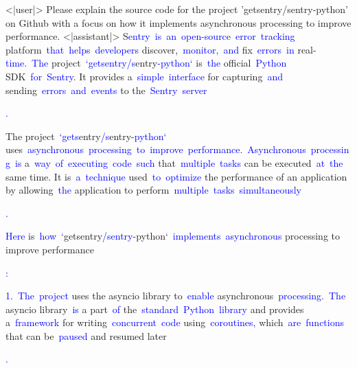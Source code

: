 \documentclass{article}
\begin{document}
\begin{tcolorbox}[colframe=black,colback=white]
<|user|>
Please explain the source code for the project 'getsentry/sentry-python' on Github with a focus on how it implements asynchronous processing to improve performance.
<|assistant|>
S\textcolor{blue}{entry}\textcolor{blue}{~is}\textcolor{blue}{~an}\textcolor{blue}{~open}\textcolor{blue}{-source}\textcolor{blue}{~error}\textcolor{blue}{~tracking} platform\textcolor{blue}{~that}\textcolor{blue}{~helps}\textcolor{blue}{~developers} discover,\textcolor{blue}{~monitor}\textcolor{blue}{,}\textcolor{blue}{~and} fix\textcolor{blue}{~errors}\textcolor{blue}{~in} real\textcolor{blue}{-time}\textcolor{blue}{.}\textcolor{blue}{~The} project\textcolor{blue}{~`}\textcolor{blue}{gets}\textcolor{blue}{entry}\textcolor{blue}{/s}entry\textcolor{blue}{-python}\textcolor{blue}{`} is\textcolor{blue}{~the} official\textcolor{blue}{~Python} SDK\textcolor{blue}{~for}\textcolor{blue}{~Sentry}. It provides a\textcolor{blue}{~simple}\textcolor{blue}{~interface} for capturing\textcolor{blue}{~and} sending\textcolor{blue}{~errors}\textcolor{blue}{~and}\textcolor{blue}{~events} to the\textcolor{blue}{~Sentry}\textcolor{blue}{~server}\textcolor{blue}{.

}The project\textcolor{blue}{~`}\textcolor{blue}{gets}entry\textcolor{blue}{/s}entry\textcolor{blue}{-python}\textcolor{blue}{`} uses\textcolor{blue}{~asynchronous}\textcolor{blue}{~processing}\textcolor{blue}{~to}\textcolor{blue}{~improve}\textcolor{blue}{~performance}\textcolor{blue}{.}\textcolor{blue}{~As}\textcolor{blue}{ynchronous}\textcolor{blue}{~processing}\textcolor{blue}{~is} a\textcolor{blue}{~way}\textcolor{blue}{~of}\textcolor{blue}{~executing}\textcolor{blue}{~code}\textcolor{blue}{~such} that\textcolor{blue}{~multiple}\textcolor{blue}{~tasks} can be executed\textcolor{blue}{~at}\textcolor{blue}{~the} same time. It is\textcolor{blue}{~a}\textcolor{blue}{~technique} used\textcolor{blue}{~to}\textcolor{blue}{~optimize} the performance of an application by allowing\textcolor{blue}{~the} application to perform\textcolor{blue}{~multiple}\textcolor{blue}{~tasks}\textcolor{blue}{~simultaneously}\textcolor{blue}{.

}\textcolor{blue}{Here} is\textcolor{blue}{~how}\textcolor{blue}{~`}getsentry\textcolor{blue}{/s}\textcolor{blue}{entry}-python`\textcolor{blue}{~implements}\textcolor{blue}{~asynchronous} processing to improve performance\textcolor{blue}{:

}\textcolor{blue}{1}\textcolor{blue}{.}\textcolor{blue}{~The}\textcolor{blue}{~project} uses the asyncio library to\textcolor{blue}{~enable} asynchronous\textcolor{blue}{~processing}.\textcolor{blue}{~The} asyncio library\textcolor{blue}{~is} a part\textcolor{blue}{~of} the\textcolor{blue}{~standard}\textcolor{blue}{~Python}\textcolor{blue}{~library} and provides a\textcolor{blue}{~framework} for writing\textcolor{blue}{~concurrent}\textcolor{blue}{~code} using\textcolor{blue}{~cor}\textcolor{blue}{outines}\textcolor{blue}{,} which\textcolor{blue}{~are}\textcolor{blue}{~functions} that can be\textcolor{blue}{~paused} and resumed later\textcolor{blue}{.

}
\end{tcolorbox}
\end{document}
